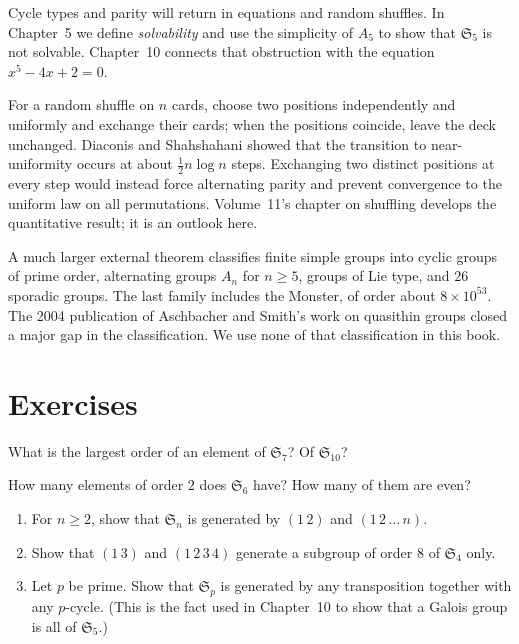 \begin{beauty}
Cycle types and parity will return in equations and random shuffles. In Chapter~5 we define \emph{solvability} and use the simplicity of $A_5$ to show that $\mathfrak S_5$ is not solvable. Chapter~10 connects that obstruction with the equation $x^5-4x+2=0$.

For a random shuffle on $n$ cards, choose two positions independently and uniformly and exchange their cards; when the positions coincide, leave the deck unchanged. Diaconis and Shahshahani showed that the transition to near-uniformity occurs at about $\frac12n\log n$ steps. Exchanging two distinct positions at every step would instead force alternating parity and prevent convergence to the uniform law on all permutations. Volume~11's chapter on shuffling develops the quantitative result; it is an outlook here.

A much larger external theorem classifies finite simple groups into cyclic groups of prime order, alternating groups $A_n$ for $n\ge5$, groups of Lie type, and $26$ sporadic groups. The last family includes the Monster, of order about $8\times10^{53}$. The 2004 publication of Aschbacher and Smith's work on quasithin groups closed a major gap in the classification. We use none of that classification in this book.
\end{beauty}

\section{Exercises}

\begin{exercise}[$\star\star$]\label{ex:landau}
What is the largest order of an element of $\mathfrak S_7$? Of $\mathfrak S_{10}$?
\end{exercise}

\begin{exercise}[$\star$]\label{ex:order2}
How many elements of order $2$ does $\mathfrak S_6$ have? How many of them are even?
\end{exercise}

\begin{exercise}[$\star\star$]\label{ex:gens12n}
\begin{enumerate}[label=(\alph*)]
\item For $n\ge2$, show that $\mathfrak S_n$ is generated by $(1\,2)$ and $(1\,2\,\dots\,n)$.
\item Show that $(1\,3)$ and $(1\,2\,3\,4)$ generate a subgroup of order $8$ of $\mathfrak S_4$ only.
\item Let $p$ be prime. Show that $\mathfrak S_p$ is generated by any transposition together with any $p$-cycle. (This is the fact used in Chapter~10 to show that a Galois group is all of $\mathfrak S_5$.)
\end{enumerate}
\end{exercise}

